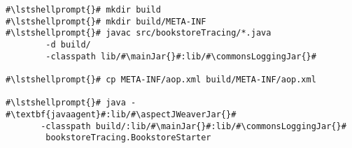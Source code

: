 \begin{lstlisting}[caption=Commands to compile and run the Bookstore under \UnixLikeSystems, label=lst:traceAnalysisCompileRunExample1]
#\lstshellprompt{}# mkdir build
#\lstshellprompt{}# mkdir build/META-INF
#\lstshellprompt{}# javac src/bookstoreTracing/*.java
        -d build/ 
        -classpath lib/#\mainJar{}#:lib/#\commonsLoggingJar{}#

#\lstshellprompt{}# cp META-INF/aop.xml build/META-INF/aop.xml

#\lstshellprompt{}# java -#\textbf{javaagent}#:lib/#\aspectJWeaverJar{}# 
       -classpath build/:lib/#\mainJar{}#:lib/#\commonsLoggingJar{}#
        bookstoreTracing.BookstoreStarter
\end{lstlisting}
